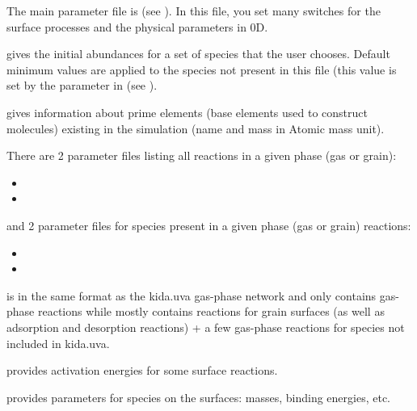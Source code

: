 \documentclass[english,a4paper,twoside]{article}
\begin{document}
The main parameter file is  (see ). In this file, you set many switches for the surface processes and the physical parameters in 0D. 

 gives the initial abundances for a set of species that the user chooses. Default minimum values are applied to the species not present in this file (this value is set by the parameter  in  (see ). 

 gives information about prime elements (base elements used to construct molecules) existing in the simulation (name and mass in Atomic mass unit). 

There are 2 parameter files listing all reactions in a given phase (gas or grain): 
\begin{itemize}
\item {}
\item {}
\end{itemize}
and 2 parameter files for species present in a given phase (gas or grain) reactions:
\begin{itemize}
\item {}
\item {}
\end{itemize}

\begin{remarque}
 is in the same format as the kida.uva gas-phase network and only contains gas-phase reactions while  mostly contains reactions for grain surfaces (as well as adsorption and desorption reactions) + a few gas-phase reactions for species not included in kida.uva. 
\end{remarque}

 provides activation energies for some surface reactions. 

 provides parameters for species on the surfaces: masses, binding energies, etc. 
\end{document}
